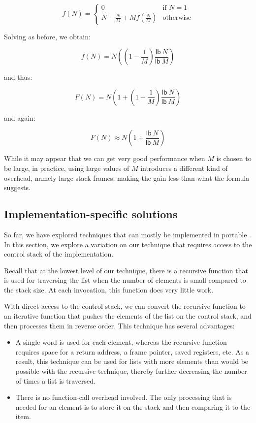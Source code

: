 \[ f(N) = \left\{ \begin{array}{ll}
                    0 & \mbox{if $N = 1$} \\
                    N - \frac{N}{M} + Mf(\frac{N}{M}) &\mbox{otherwise}
                  \end{array} \right. \]

Solving as before, we obtain:

\[ f(N) = N((1 - \frac{1}{M})\frac{\mathsf{lb}~N}{\mathsf{lb}~M}) \]

and thus:

\[ F(N) = N(1 + (1 - \frac{1}{M})\frac{\mathsf{lb}~N}{\mathsf{lb}~M}) \]

and again:

\[ F(N) \approx N(1 + \frac{\mathsf{lb}~N}{\mathsf{lb}~M}) \]

While it may appear that we can get very good performance when $M$ is
chosen to be large, in practice, using large values of $M$ introduces
a different kind of overhead, namely large stack frames, making the
gain less than what the formula suggests.

\subsection{Implementation-specific solutions}

So far, we have explored techniques that can mostly be implemented in
portable \commonlisp{}.  In this section, we explore a variation on
our technique that requires access to the control stack of the
implementation.

Recall that at the lowest level of our technique, there is a recursive
function that is used for traversing the list when the number of
elements is small compared to the stack size.  At each invocation,
this function does very little work.

With direct access to the control stack, we can convert the recursive
function to an iterative function that pushes the elements of the list
on the control stack, and then processes them in reverse order.  This
technique has several advantages:

\begin{itemize}
\item A single word is used for each element, whereas the recursive
  function requires space for a return address, a frame pointer,
  saved registers, etc.  As a result, this technique can be used for
  lists with more elements than would be possible with the recursive
  technique, thereby further decreasing the number of times a list is
  traversed.
\item There is no function-call overhead involved.  The only
  processing that is needed for an element is to store it on the stack
  and then comparing it to the item.
\end{itemize}


